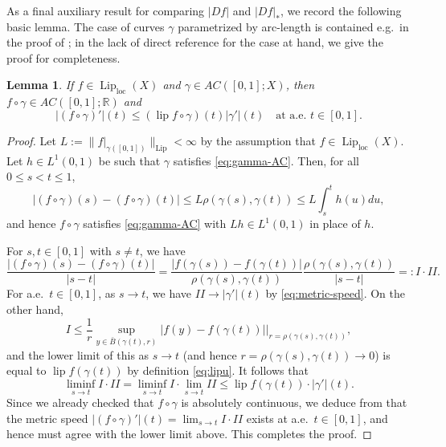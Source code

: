 \documentclass[11pt]{amsart}
\newtheorem{lemma}[theorem]{Lemma}
\theoremstyle{definition}
\theoremstyle{remark}
\numberwithin{equation}{section}
\newcommand{\abs}[1]{|#1|}
\newcommand{\Norm}[2]{\|#1\|_{#2}}
\begin{document}
As a final auxiliary result for comparing $\abs{Df}$ and $\abs{Df}_*$, we record the
following
basic lemma. The case of curves $\gamma$ parametrized by arc-length is
contained e.g.\ in the proof of \cite[Lemma 6.2.6]{HKST:book}; in the lack of direct
reference for the case at hand, we give the proof for completeness.

\begin{lemma}\label{lem:chain-rule}
If $f\in\operatorname{Lip}_{\mathrm{loc}}(X)$ and $\gamma\in AC([0,1];X)$, then
$f\circ\gamma\in AC([0,1];\mathbb R)$ and
\begin{equation*}
  \abs{(f\circ\gamma)'}(t)\leq
  (\operatorname{lip}f\circ\gamma)(t)\abs{\gamma'}(t)\quad\text{at a.e. }t\in[0,1].
\end{equation*}
\end{lemma}

\begin{proof}
Let $L:=\Norm{f|_{\gamma([0,1])}}{\operatorname{Lip}}<\infty$ by the assumption that
$f\in\operatorname{Lip}_{\mathrm{loc}}(X)$. Let $h\in L^1(0,1)$ be such that $\gamma$
satisfies \eqref{eq:gamma-AC}. Then, for all $0\leq s<t\leq 1$,
\begin{equation*}
  \abs{(f\circ\gamma)(s)-(f\circ\gamma)(t)}
  \leq L\rho(\gamma(s),\gamma(t))
  \leq L\int_s^t h(u)du,
\end{equation*}
and hence $f\circ\gamma$ satisfies \eqref{eq:gamma-AC} with $Lh\in L^1(0,1)$ in place of
$h$.

For $s,t\in[0,1]$ with $s\neq t$, we have
\begin{equation*}
  \frac{\abs{(f\circ\gamma)(s)-(f\circ\gamma)(t) }}{\abs{s-t}}
  =\frac{\abs{f(\gamma(s))-f(\gamma(t)) }}{\rho(\gamma(s),\gamma(t))}
  \frac{\rho(\gamma(s),\gamma(t))}{\abs{s-t}}
  =:I\cdot II.
\end{equation*}
For a.e.\ $t\in[0,1]$, as $s\to t$, we have $II\to\abs{\gamma'}(t)$ by
\eqref{eq:metric-speed}. On the other hand,
\begin{equation*}
  I\leq\frac{1}{r}\sup_{y\in\bar
  B(\gamma(t),r)}\abs{f(y)-f(\gamma(t))}\Big|_{r=\rho(\gamma(s),\gamma(t))},
\end{equation*}
and the lower limit of this as $s\to t$ (and hence $r=\rho(\gamma(s),\gamma(t))\to 0$) is
equal to $\operatorname{lip}f(\gamma(t))$ by definition \eqref{eq:lipu}. It follows that
\begin{equation*}
  \liminf_{s\to t}I\cdot II
  =\liminf_{s\to t}I\cdot \lim_{s\to t} II
  \leq\operatorname{lip}f(\gamma(t))\cdot\abs{\gamma'}(t).
\end{equation*}
Since we already checked that $f\circ\gamma$ is absolutely continuous, we deduce from
\cite[Theorem 1.1.2]{AGS:book} that the metric speed $\abs{(f\circ\gamma)'}(t)=\lim_{s\to
t}I\cdot II$ exists at a.e.\ $t\in[0,1]$, and hence must agree with the lower limit above.
This completes the proof.
\end{proof}
\end{document}
